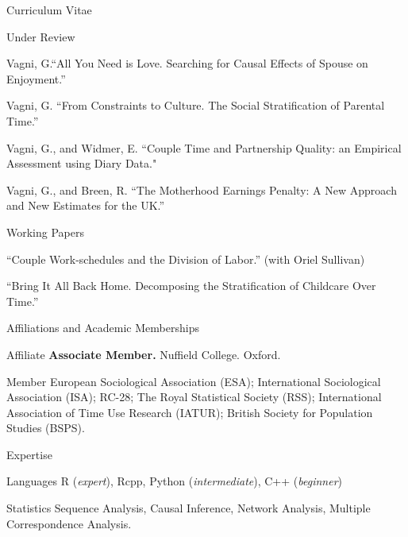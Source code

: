 \documentclass[12pt,a4paper]{article}
\newcommand*{\ac}[1]{\mbox{#1}}
\begin{document}
\begin{cv}{Curriculum Vitae}
 \begin{cvlist}{Under Review}
 
   \item Vagni, G.``All You Need is Love. Searching for Causal Effects of Spouse on Enjoyment.'' 	
 	\item Vagni, G. ``From Constraints to Culture. The Social Stratification of Parental Time.'' 
 	\item Vagni, G., and Widmer, E. ``Couple Time and Partnership Quality: an Empirical Assessment using Diary Data."
 	\item Vagni, G., and Breen, R. ``The Motherhood Earnings Penalty: A New Approach and New
 	Estimates for the UK.''
  \end{cvlist}
 
 \begin{cvlist}{Working Papers}
  	\item ``Couple Work-schedules and the Division of Labor.'' (with Oriel Sullivan)
  	\item ``Bring It All Back Home. Decomposing the Stratification of Childcare Over Time.''
\end{cvlist}
 
\begin{cvlist}{Affiliations and Academic Memberships}
	\item[Affiliate] \textbf{Associate Member.} Nuffield College. Oxford. 
	\item[Member] European Sociological Association (ESA); International Sociological Association (ISA); RC-28; The Royal Statistical Society (RSS); International Association of Time Use Research (IATUR); 
	British Society for Population Studies (BSPS). 
\end{cvlist}

\begin{cvlist}{\ac{Expertise}}
	\item[Languages] R (\emph{expert}), Rcpp, Python (\emph{intermediate}),  C++ (\emph{beginner}) 
	
	\item[Statistics] Sequence Analysis, Causal Inference, Network Analysis, Multiple Correspondence Analysis.
	
\end{cvlist}


  \date{~March~2020}
\end{cv}
\end{document}
